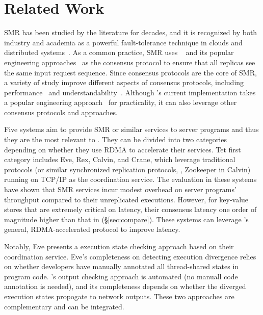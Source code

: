 \section{Related Work} \label{sec:related}


   SMR 
has been studied by the literature 
for decades, and it is recognized by both industry and academia as a powerful 
fault-tolerance technique in clouds and distributed 
systems~\cite{lamportclock,smr:tutorial}. As a common practice, SMR uses 
\paxos~\cite{paxos,paxos:simple,paxos:complex} and its popular engineering 
approaches~\cite{paxos:live,paxos:practical} as the consensus protocol to 
ensure that all replicas see the same input request sequence. Since consensus 
protocols are the core of SMR, a variety of study improve different aspects of 
consensus protocols, including performance~\cite{epaxos:sosp13,paxos:fast} and 
understandability~\cite{raft:usenix14}. Although \xxx's current implementation 
takes a popular engineering approach~\cite{paxos:practical} for practicality, 
it can also leverage other consensus protocols and approaches.

Five systems aim to provide SMR or similar services to server programs and 
thus they are the most relevant to \xxx. They can be divided into two 
categories depending on whether they use RDMA to accelerate their services. 
Tet first category includes Eve, Rex, Calvin, and Crane, which 
leverage traditional \paxos protocols (or similar synchronized replication 
protocols, \eg, Zookeeper in Calvin) running on TCP/IP as the coordination 
service. The evaluation in these systems have shown that SMR services incur 
modest overhead on server programs' throughput compared to their unreplicated 
executions. However, for key-value stores that are extremely critical on 
latency, their consensus latency one order of magnitude higher than that in 
\xxx (\S\ref{sec:compare}). These systems can leverage \xxx's general, 
RDMA-accelerated protocol to improve latency.

Notably, Eve presents a execution state checking approach based on their 
coordination service. Eve's completeness on detecting execution divergence 
relies on whether developers have manually annotated all thread-shared states 
in program code. \xxx's output checking approach is automated (no manuall code 
annotation is needed), and its completeness depends on whether the diverged 
execution states propogate to network outputs. These two approaches are 
complementary and can be integrated.


